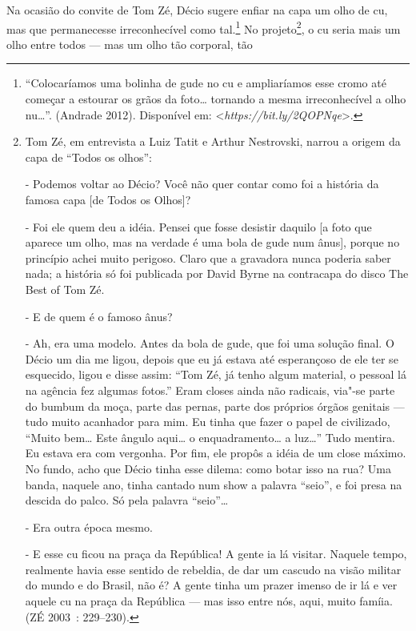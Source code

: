 Na ocasião do convite de Tom Zé, Décio sugere enfiar na capa um olho de
cu, mas que permanecesse irreconhecível como
tal.\footnote{``Colocaríamos uma bolinha de gude no
  cu e ampliaríamos esse cromo até começar a estourar os grãos da
  foto\ldots{} tornando a mesma irreconhecível a olho nu\ldots{}''.
  (Andrade 2012). Disponível em:
  \textless{}\emph{https://bit.ly/2QOPNqe}\textgreater{}.}
No projeto\footnote{Tom Zé, em entrevista a Luiz Tatit
  e Arthur Nestrovski, narrou a origem da capa de ``Todos os olhos'':

   - Podemos voltar ao Décio? Você não quer contar como foi
  a história da famosa capa {[}de Todos os Olhos{]}?

   - Foi ele quem deu a idéia. Pensei que fosse desistir daquilo {[}a
  foto que aparece um olho, mas na verdade é uma bola de gude num
  ânus{]}, porque no princípio achei muito perigoso. Claro que a
  gravadora nunca poderia saber nada; a história só foi publicada por
  David Byrne na contracapa do disco The Best of Tom Zé.

   - E de quem é o famoso ânus?

   - Ah, era uma modelo. Antes da bola de gude, que foi uma solução
  final. O Décio um dia me ligou, depois que eu já estava até
  esperançoso de ele ter se esquecido, ligou e disse assim: ``Tom Zé, já
  tenho algum material, o pessoal lá na agência fez algumas fotos.''
  Eram closes ainda não radicais, via"-se parte do bumbum da moça,
  parte das pernas, parte dos próprios órgãos genitais --- tudo muito
  acanhador para mim. Eu tinha que fazer o papel de civilizado, ``Muito
  bem\ldots{} Este ângulo aqui\ldots{} o enquadramento\ldots{} a luz\ldots{}'' Tudo mentira.
  Eu estava era com vergonha. Por fim, ele propôs a idéia de um close
  máximo. No fundo, acho que Décio tinha esse dilema: como botar isso na
  rua? Uma banda, naquele ano, tinha cantado num show a palavra
  ``seio'', e foi presa na descida do palco. Só pela palavra ``seio''\ldots{}

   - Era outra época mesmo.

   - E esse cu ficou na praça da República! A gente ia lá visitar.
  Naquele tempo, realmente havia esse sentido de rebeldia, de dar um
  cascudo na visão militar do mundo e do Brasil, não é? A gente tinha um
  prazer imenso de ir lá e ver aquele cu na praça da República --- mas
  isso entre nós, aqui, muito famíia. (ZÉ 2003~: 229--230).}, o cu
seria mais um olho entre todos --- mas um olho tão corporal, tão
